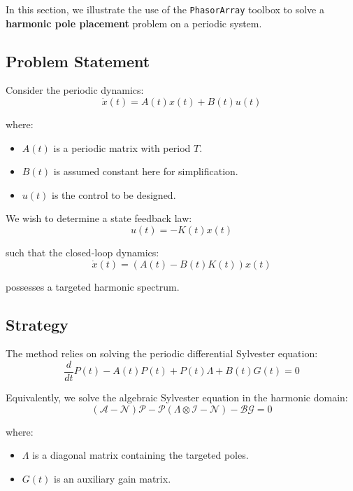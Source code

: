 \documentclass[11pt,a4paper]{article}
\begin{document}
In this section, we illustrate the use of the \texttt{PhasorArray} toolbox to solve a \textbf{harmonic pole placement} problem on a periodic system.

\subsection{Problem Statement}

Consider the periodic dynamics:
\begin{equation}
\dot{x}(t) = A(t) x(t) + B(t) u(t)
\end{equation}

where:
\begin{itemize}
    \item $A(t)$ is a periodic matrix with period $T$.
    \item $B(t)$ is assumed constant here for simplification.
    \item $u(t)$ is the control to be designed.
\end{itemize}

We wish to determine a state feedback law:
\begin{equation}
u(t) = -K(t) x(t)
\end{equation}

such that the closed-loop dynamics:
\begin{equation}
\dot{x}(t) = (A(t) - B(t)K(t))x(t)
\end{equation}

possesses a targeted harmonic spectrum.

\subsection{Strategy}

The method relies on solving the periodic differential Sylvester equation:
\begin{equation}
\frac{d}{dt}P(t) - A(t)P(t) + P(t)\Lambda + B(t)G(t) = 0
\end{equation}

Equivalently, we solve the algebraic Sylvester equation in the harmonic domain:
\begin{equation}
(\mathcal{A}-\mathcal{N})\mathcal{P} - \mathcal{P}(\Lambda\otimes \mathcal{I} - \mathcal{N}) - \mathcal{B}\mathcal{G} = 0
\end{equation}

where:
\begin{itemize}
    \item $\Lambda$ is a diagonal matrix containing the targeted poles.
    \item $G(t)$ is an auxiliary gain matrix.
\end{itemize}
\end{document}
